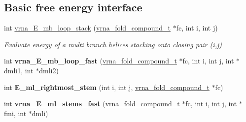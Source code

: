 \subsection*{Basic free energy interface}
\begin{DoxyCompactItemize}
\item 
int \hyperlink{group__eval__loops__mb_ga91af6d5fcb0aef243a4071cf9e718020}{vrna\+\_\+\+E\+\_\+mb\+\_\+loop\+\_\+stack} (\hyperlink{group__fold__compound_ga1b0cef17fd40466cef5968eaeeff6166}{vrna\+\_\+fold\+\_\+compound\+\_\+t} $\ast$fc, int i, int j)
\begin{DoxyCompactList}\small\item\em Evaluate energy of a multi branch helices stacking onto closing pair (i,j) \end{DoxyCompactList}\item 
\mbox{\label{group__eval__loops__mb_ga2fb0e2d1e0d6280f4e8e7f12b345c334}} 
int {\bfseries vrna\+\_\+\+E\+\_\+mb\+\_\+loop\+\_\+fast} (\hyperlink{group__fold__compound_ga1b0cef17fd40466cef5968eaeeff6166}{vrna\+\_\+fold\+\_\+compound\+\_\+t} $\ast$fc, int i, int j, int $\ast$dmli1, int $\ast$dmli2)
\item 
\mbox{\label{group__eval__loops__mb_gabbf601fe425b60dbc6599865bb8a1ee3}} 
int {\bfseries E\+\_\+ml\+\_\+rightmost\+\_\+stem} (int i, int j, \hyperlink{group__fold__compound_ga1b0cef17fd40466cef5968eaeeff6166}{vrna\+\_\+fold\+\_\+compound\+\_\+t} $\ast$fc)
\item 
\mbox{\label{group__eval__loops__mb_ga9e000f5f16177b8696bde5ed4db96d18}} 
int {\bfseries vrna\+\_\+\+E\+\_\+ml\+\_\+stems\+\_\+fast} (\hyperlink{group__fold__compound_ga1b0cef17fd40466cef5968eaeeff6166}{vrna\+\_\+fold\+\_\+compound\+\_\+t} $\ast$fc, int i, int j, int $\ast$fmi, int $\ast$dmli)
\end{DoxyCompactItemize}
